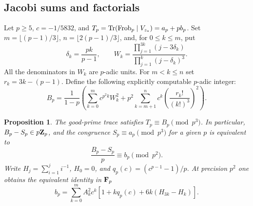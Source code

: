 \documentclass[11pt,letterpaper]{article}
\newtheorem{proposition}[theorem]{Proposition}
\theoremstyle{definition}
\theoremstyle{remark}
\begin{document}
\subsection{Jacobi sums and factorials}
Let $p\geq5$, $c=-1/5832$, and $T_p=\operatorname{Tr}(\operatorname{Frob}_p\mid V_{z_*})=a_p+p b_p$.
Set $m=\lfloor(p-1)/3\rfloor$, $n=\lfloor 2(p-1)/3\rfloor$, and, for $0\le k\le m$, put
\[
 \delta_k=\frac{pk}{p-1},\qquad
 W_k=\frac{\prod_{j=1}^{3k}(j-3\delta_k)}
              {\prod_{j=1}^{k}(j-\delta_k)^3}.
\]
All the denominators in $W_k$ are $p$-adic units. For $m< k\le n$ set
$r_k=3k-(p-1)$. Define the following explicitly computable $p$-adic integer:
\[
 B_p=\frac1{1-p}\left(
 \sum_{k=0}^{m} c^{p^2 k} W_k^2
 +p^2\sum_{k=m+1}^{n} c^{k}
                 \left(\frac{r_k!}{(k!)^3}\right)^{\!2}\right).
\]
\begin{proposition}\label{IV:prop:gamma-digits}
The good-prime trace satisfies $T_p\equiv B_p\pmod {p^3}$. In particular,
$B_p-S_p\in p\mathbf Z_p$, and the congruence $S_p\equiv a_p\pmod {p^3}$
for a given $p$ is equivalent to
\[
 \frac{B_p-S_p}{p}\equiv b_p\pmod {p^2}.
\]
Write $H_j=\sum_{i=1}^j i^{-1}$, $H_0=0$, and $q_p(c)=(c^{p-1}-1)/p$.
At precision $p^2$ one obtains the equivalent identity in $\mathbf F_p$
\[
 b_p=\sum_{k=0}^{m}A_k^2 c^k\left[1+k q_p(c)+6k(H_{3k}-H_k)\right].
\]
\end{proposition}
\end{document}
